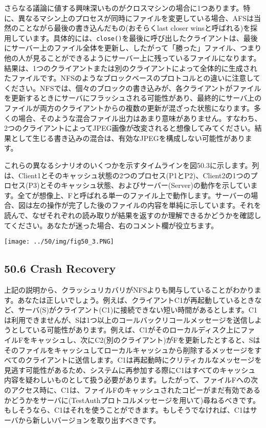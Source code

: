さらなる議論に値する興味深いものがクロスマシンの場合に1つあります。特に、異なるマシン上のプロセスが同時にファイルを変更している場合、AFSは当然のことながら最後の書き込んだもの(おそらくlast
closer
winsと呼ばれる)を採用しています。具体的には、\texttt{close()}を最後に呼び出したクライアントは、最後にサーバー上のファイル全体を更新し、したがって「勝った」ファイル、つまり他の人が見ることができるようにサーバー上に残っているファイルになります。結果は、1つのクライアントまたは別のクライアントによって全体的に生成されたファイルです。NFSのようなブロックベースのプロトコルとの違いに注意してください。NFSでは、個々のブロックの書き込みが、各クライアントがファイルを更新するときにサーバにフラッシュされる可能性があり、最終的にサーバ上のファイルが両方のクライアントからの複数の更新が混ざった状態になります。多くの場合、そのような混合ファイル出力はあまり意味がありません。すなわち、2つのクライアントによってJPEG画像が改変されると想像してみてください。結果として生じる書き込みの混合は、有効なJPEGを構成しない可能性があります。

これらの異なるシナリオのいくつかを示すタイムラインを図50.3に示します。列は、Client1とそのキャッシュ状態の2つのプロセス(P1とP2)、Client2の1つのプロセス(P3)とそのキャッシュ状態、およびサーバー(Server)の動作を示しています。全てが想像上、Fと呼ばれる単一のファイル上で動作します。サーバーの場合、図は左の操作が完了した後のファイルの内容を単純に示しています。それを読んで、なぜそれぞれの読み取りが結果を返すのか理解できるかどうかを確認してください。あなたが迷った場合、右のコメント欄が役立ちます。

\texttt{[image: ../50/img/fig50\_3.PNG]}

\hypertarget{crash-recovery}{%
\subsection*{50.6 Crash Recovery}\label{crash-recovery}}

上記の説明から、クラッシュリカバリがNFSよりも関与していることがわかります。あなたは正しいでしょう。例えば、クライアントC1が再起動しているときなど、サーバ(S)がクライアント(C1)に接続できない短い時間があるとします。C1は利用できませんが、Sは1つ以上のコールバックリコールメッセージを送信しようとしている可能性があります。例えば、C1がそのローカルディスク上にファイルFをキャッシュし、次にC2(別のクライアント)がFを更新したとすると、Sはそのファイルをキャッシュしてローカルキャッシュから削除するメッセージをすべてのクライアントに送信します。C1は再起動時にクリティカルなメッセージを見逃す可能性があるため、システムに再参加する際にC1はすべてのキャッシュ内容を疑わしいものとして扱う必要があります。したがって、ファイルFへの次のアクセス時に、C1は、ファイルFのキャッシュされたコピーがまだ有効であるかどうかをサーバに(TestAuthプロトコルメッセージを用いて)尋ねるべきです。もしそうなら、C1はそれを使うことができます。もしそうでなければ、C1はサーバから新しいバージョンを取り出すべきです。

